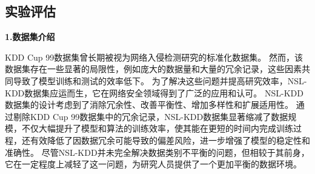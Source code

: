 \subsection{实验评估}
\textbf{1.数据集介绍}\par
KDD Cup 99数据集\cite{tavallaee2009detailed}曾长期被视为网络入侵检测研究的标准化数据集。
然而，该数据集存在一些显著的局限性，例如庞大的数据量和大量的冗余记录，这些因素共同导致了模型训练和测试的效率低下。
为了解决这些问题并提高研究效率，NSL-KDD数据集\cite{revathi2013detailed}应运而生，它在网络安全领域得到了广泛的应用和认可。
NSL-KDD数据集的设计考虑到了消除冗余性、改善平衡性、增加多样性和扩展适用性。
通过剔除KDD Cup 99数据集中的冗余记录，NSL-KDD数据集显著缩减了数据规模，不仅大幅提升了模型和算法的训练效率，使其能在更短的时间内完成训练过程，还有效降低了因数据冗余可能导致的偏差风险，进一步增强了模型的稳定性和准确性。
尽管NSL-KDD并未完全解决数据类别不平衡的问题，但相较于其前身，它在一定程度上减轻了这一问题，为研究人员提供了一个更加平衡的数据环境。\par

